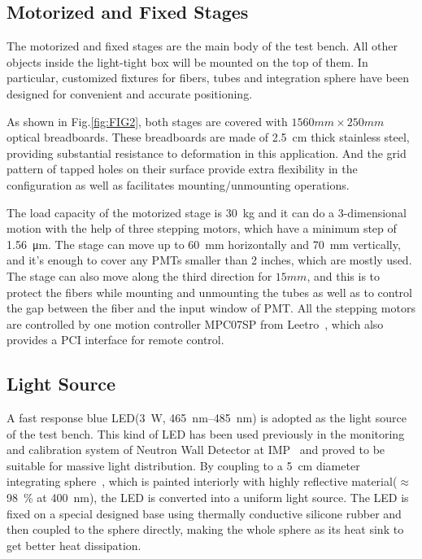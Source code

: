 \documentclass[review, times]{elsarticle}
\begin{document}
\subsection{Motorized and Fixed Stages}
\label{sec:stages}

The motorized and fixed stages are the main body of the test bench.
All other objects inside the light-tight box will be mounted on the top of them.
In particular, customized fixtures for fibers, tubes and integration sphere have been designed for convenient and accurate positioning.

As shown in Fig.\ref{fig:FIG2}, both stages are covered with $1560mm\times250mm$ optical breadboards. 
These breadboards are made of \SI{2.5}{cm} thick stainless steel, providing substantial resistance to deformation in this application. 
And the grid pattern of tapped holes on their surface provide extra flexibility in the configuration as well as facilitates mounting/unmounting operations.

The load capacity of the motorized stage is \SI{30}{\kilo\gram} and it can do a 3-dimensional motion with the help of three stepping motors, which have a minimum step of \SI{1.56}{\micro\meter}.
The stage can move up to \SI{60}{\milli\meter} horizontally and \SI{70}{\milli\meter} vertically, and it's enough to cover any PMTs smaller than 2 inches, which are mostly used.
The stage can also move along the third direction for $15mm$, and this is to protect the fibers while mounting and unmounting the tubes as well as to control the gap between the fiber and the input window of PMT.
All the stepping motors are controlled by one motion controller MPC07SP from Leetro~\cite{leetro}, which also provides a PCI interface for remote control.

\subsection{Light Source}
\label{sec:light_source}

A fast response blue LED(\SI{3}{\watt}, \SIrange{465}{485}{\nano\meter}) is adopted as the light source of the test bench. This kind of LED has been used previously in the monitoring and calibration system of Neutron Wall Detector at IMP~\cite{yuyuhong_led} and proved to be suitable for massive light distribution. 
By coupling to a \SI{5}{\centi\meter} diameter integrating sphere~\cite{integrating_sphere}, which is painted interiorly with highly reflective material($\approx$\SI{98}{\percent} at \SI{400}{\nano\meter}), the LED is converted into a uniform light source.
The LED is fixed on a special designed base using thermally conductive silicone rubber and then coupled to the sphere directly, making the whole sphere as its heat sink to get better heat dissipation.
\end{document}
